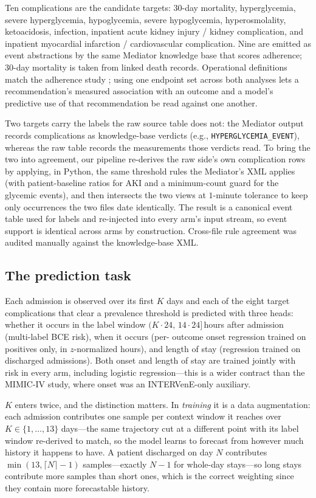 Ten complications are the candidate targets: $30$-day mortality,
hyperglycemia, severe hyperglycemia, hypoglycemia, severe hypoglycemia,
hyperosmolality, ketoacidosis, infection, inpatient acute kidney injury /
kidney complication, and inpatient myocardial infarction / cardiovascular
complication. Nine are emitted as event abstractions by the same Mediator
knowledge base that scores adherence; $30$-day mortality is taken from
linked death records. Operational definitions match the adherence study
\citep{oded2027kineret-jbi}; using one endpoint set across both analyses
lets a recommendation's measured association with an outcome and a
model's predictive use of that recommendation be read against one
another.

Two targets carry the labels the raw source table does not: the Mediator
output records complications as knowledge-base verdicts (e.g.,
\texttt{HYPERGLYCEMIA\_EVENT}), whereas the raw table records the
measurements those verdicts read. To bring the two into agreement, our
pipeline re-derives the raw side's own complication rows by applying, in
Python, the same threshold rules the Mediator's XML applies (with
patient-baseline ratios for AKI and a minimum-count guard for the
glycemic events), and then intersects the two views at $1$-minute
tolerance to keep only occurrences the two files date identically. The
result is a canonical event table used for labels and re-injected into
every arm's input stream, so event support is identical across arms by
construction. Cross-file rule agreement was audited manually against the
knowledge-base XML.

\subsection{The prediction task}
\label{sec:methods-task}

Each admission is observed over its first $K$ days and each of the eight
target complications that clear a prevalence threshold is predicted with
three heads: whether it occurs in the label window $(K \cdot 24,\,14 \cdot
24]$\,hours after admission (multi-label BCE risk), when it occurs (per-
outcome onset regression trained on positives only, in $z$-normalized
hours), and length of stay (regression trained on discharged admissions).
Both onset and length of stay are trained jointly with risk in every arm,
including logistic regression---this is a wider contract than the
MIMIC-IV study, where onset was an INTERVenE-only auxiliary.

$K$ enters twice, and the distinction matters. In \emph{training} it is a
data augmentation: each admission contributes one sample per context
window it reaches over $K \in \{1,\ldots,13\}$ days---the same trajectory
cut at a different point with its label window re-derived to match, so
the model learns to forecast from however much history it happens to
have. A patient discharged on day $N$ contributes $\min(13, \lceil N
\rceil - 1)$ samples---exactly $N - 1$ for whole-day stays---so long
stays contribute more samples than short ones, which is the correct
weighting since they contain more forecastable history.

